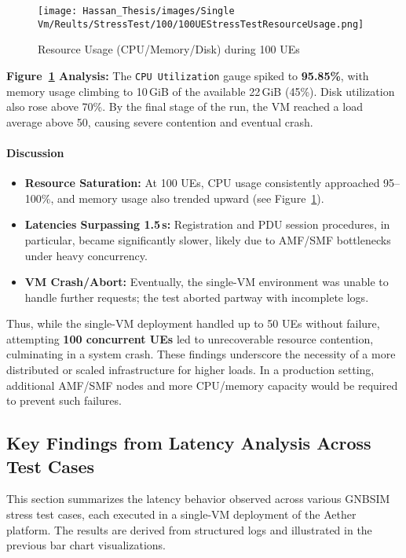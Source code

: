 \begin{figure}[H]
    \centering
    \texttt{[image: Hassan\_Thesis/images/Single Vm/Reults/StressTest/100/100UEStressTestResourceUsage.png]}
    \caption{Resource Usage (CPU/Memory/Disk) during 100 UEs}
    \label{fig:100ue-resource-usage}
\end{figure}

\noindent
\textbf{Figure~\ref{fig:100ue-resource-usage} Analysis:}  
The \texttt{CPU Utilization} gauge spiked to \textbf{95.85\%}, with memory usage climbing to 10\,GiB of the available 22\,GiB (45\%). Disk utilization also rose above 70\%. By the final stage of the run, the VM reached a load average above 50, causing severe contention and eventual crash.

\paragraph{Discussion}
\begin{itemize}
  \item \textbf{Resource Saturation:} At 100 UEs, CPU usage consistently approached 95--100\%, and memory usage also trended upward (see Figure~\ref{fig:100ue-resource-usage}).  
  \item \textbf{Latencies Surpassing 1.5\,s:} Registration and PDU session procedures, in particular, became significantly slower, likely due to AMF/SMF bottlenecks under heavy concurrency.
  \item \textbf{VM Crash/Abort:} Eventually, the single-VM environment was unable to handle further requests; the test aborted partway with incomplete logs.
\end{itemize}

Thus, while the single-VM deployment handled up to 50 UEs without failure, attempting \textbf{100 concurrent UEs} led to unrecoverable resource contention, culminating in a system crash. These findings underscore the necessity of a more distributed or scaled infrastructure for higher loads. In a production setting, additional AMF/SMF nodes and more CPU/memory capacity would be required to prevent such failures.



\subsection{Key Findings from Latency Analysis Across Test Cases}
\label{sec:key-findings}

This section summarizes the latency behavior observed across various GNBSIM stress test cases, each executed in a single-VM deployment of the Aether platform. The results are derived from structured logs and illustrated in the previous bar chart visualizations.

